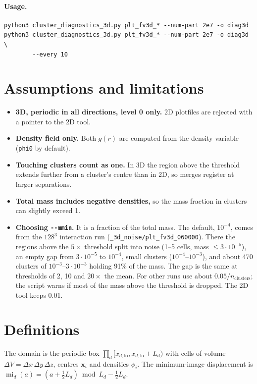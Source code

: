\documentclass[11pt]{article}
\newcommand{\code}[1]{\texttt{#1}}
\begin{document}
\paragraph{Usage.}
\begin{verbatim}
python3 cluster_diagnostics_3d.py plt_fv3d_* --num-part 2e7 -o diag3d
python3 cluster_diagnostics_3d.py plt_fv3d_* --num-part 2e7 -o diag3d \
        --every 10
\end{verbatim}

\section{Assumptions and limitations}
\begin{itemize}
  \item \textbf{3D, periodic in all directions, level 0 only.} 2D plotfiles are
        rejected with a pointer to the 2D tool.
  \item \textbf{Density field only.} Both $g(r)$ are computed from the density
        variable (\code{phi0} by default).
  \item \textbf{Touching clusters count as one.} In 3D the region above the
        threshold extends further from a cluster's centre than in 2D, so merges
        register at larger separations.
  \item \textbf{Total mass includes negative densities,} so the mass fraction in
        clusters can slightly exceed 1.
  \item \textbf{Choosing \code{-{}-mmin}.} It is a fraction of the total mass.
        The default, $10^{-4}$, comes from the $128^3$ interaction run
        (\code{\_3d\_noise/plt\_fv3d\_060000}). There the regions above the
        $5\times$ threshold split into noise (1--5 cells, mass
        $\le3\cdot10^{-5}$), an empty gap from $3\cdot10^{-5}$ to $10^{-4}$,
        small clusters ($10^{-4}$--$10^{-3}$), and about 470 clusters of
        $10^{-3}$--$3\cdot10^{-3}$ holding 91\% of the mass. The gap is the
        same at thresholds of 2, 10 and $20\times$ the mean. For other runs use
        about $0.05/n_{\mathrm{clusters}}$; the script warns if most of the mass
        above the threshold is dropped. The 2D tool keeps 0.01.
\end{itemize}

\section{Definitions}

The domain is the periodic box
$\prod_d[x_{d,\mathrm{lo}}, x_{d,\mathrm{lo}}+L_d)$ with cells of volume
$\Delta V=\Delta x\,\Delta y\,\Delta z$, centres $\mathbf{x}_i$ and densities
$\phi_i$. The minimum-image displacement is
$\operatorname{mi}_d(a) = (a+\tfrac12L_d)\bmod L_d - \tfrac12L_d$.
\end{document}
